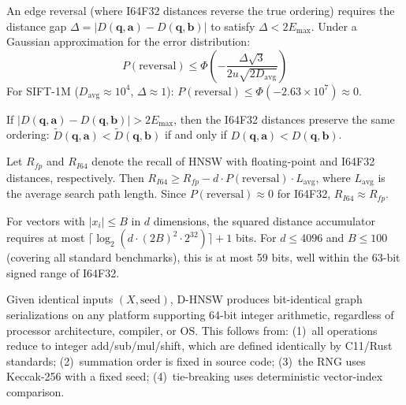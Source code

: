 \documentclass[10pt,journal,compsoc]{IEEEtran}
\newcommand{\dhnsw}{\textsc{D-HNSW}}
\newcommand{\hnsw}{\textsc{HNSW}}
\begin{document}
\begin{theorem}
\label{thm:edge_reversal}
An edge reversal (where I64F32 distances reverse the true ordering) requires the distance gap $\Delta = |D(\mathbf{q}, \mathbf{a}) - D(\mathbf{q}, \mathbf{b})|$ to satisfy $\Delta < 2E_{\max}$. Under a Gaussian approximation for the error distribution:
\begin{equation}
  P(\text{reversal}) \leq \Phi\!\left(-\frac{\Delta\sqrt{3}}{2u\sqrt{2D_{\text{avg}}}}\right)
\end{equation}
For SIFT-1M ($D_{\text{avg}} \approx 10^4$, $\Delta \approx 1$): $P(\text{reversal}) \leq \Phi(-2.63 \times 10^7) \approx 0$.
\end{theorem}

\begin{theorem}
\label{thm:order_pres}
If $|D(\mathbf{q}, \mathbf{a}) - D(\mathbf{q}, \mathbf{b})| > 2E_{\max}$, then the I64F32 distances preserve the same ordering: $\tilde{D}(\mathbf{q}, \mathbf{a}) < \tilde{D}(\mathbf{q}, \mathbf{b})$ if and only if $D(\mathbf{q}, \mathbf{a}) < D(\mathbf{q}, \mathbf{b})$.
\end{theorem}

\begin{theorem}
\label{thm:recall_pres}
Let $R_{fp}$ and $R_{I64}$ denote the recall of \hnsw{} with floating-point and I64F32 distances, respectively. Then $R_{I64} \geq R_{fp} - d \cdot P(\text{reversal}) \cdot L_{\text{avg}}$, where $L_{\text{avg}}$ is the average search path length. Since $P(\text{reversal}) \approx 0$ for I64F32, $R_{I64} \approx R_{fp}$.
\end{theorem}

\begin{theorem}
\label{thm:overflow}
For vectors with $|x_i| \leq B$ in $d$ dimensions, the squared distance accumulator requires at most $\lceil\log_2(d \cdot (2B)^2 \cdot 2^{32})\rceil + 1$ bits. For $d \leq 4096$ and $B \leq 100$ (covering all standard benchmarks), this is at most 59 bits, well within the 63-bit signed range of I64F32.
\end{theorem}

\begin{theorem}
\label{thm:crossplatform}
Given identical inputs $(X, \text{seed})$, \dhnsw{} produces bit-identical graph serializations on any platform supporting 64-bit integer arithmetic, regardless of processor architecture, compiler, or OS. This follows from: (1)~all operations reduce to integer add/sub/mul/shift, which are defined identically by C11/Rust standards; (2)~summation order is fixed in source code; (3)~the RNG uses Keccak-256 with a fixed seed; (4)~tie-breaking uses deterministic vector-index comparison.
\end{theorem}
\end{document}
